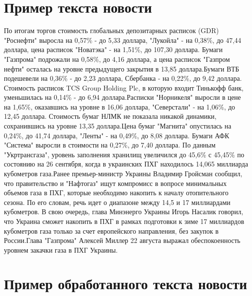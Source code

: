 \documentclass[14pt]{matmex-diploma-custom}
\begin{document}
\begin{appendices}
\section{Пример текста новости}

\label{app:text}

\noindent
По итогам торгов стоимость глобальных депозитарных расписок (GDR) "Роснефти" выросла на 0,57\% - до 5,33 доллара, "Лукойла" - на 0,38\%, до 47,44 доллара, цена расписок "Новатэка" - на 1,51\%, до 107,30 доллара. Бумаги "Газпрома" подрожали на 0,58\%, до 4,16 доллара, а цена расписок "Газпром нефти" осталась на уровне предыдущего закрытия в 13,85 доллара.Бумаги ВТБ подешевели на 0,36\% - до 2,23 доллара, Сбербанка - на 0,22\%, до 9,42 доллара. Стоимость расписок TCS Group Holding Plc, в которую входит Тинькофф банк, уменьшилась на 0,14\% - до 6,94 доллара.Расписки "Норникеля" выросли в цене на 1,65\%, оказавшись на уровне в 16,06 доллара, "Северстали" - на 1,06\%, до 12,45 доллара. Стоимость бумаг НЛМК не показала никакой динамики, сохранившись на уровне 13,35 доллара.Цена бумаг "Магнита" опустилась на 0,24\%, до 41,74 доллара, "Ленты" - на 0,49\%, до 8,08 доллара. Бумаги АФК "Система" выросли в стоимости на 0,27\%, до 7,40 доллара. По данным "Укртрансгаза", уровень заполнения хранилищ увеличился до 45,6\% с 45,45\% по состоянию на 26 сентября, когда в украинских ПХГ находилось 14,065 миллиарда кубометров газа.Ранее премьер-министр Украины Владимир Гройсман сообщил, что правительство и "Нафтогаз" ищут компромисс в вопросе минимальных объемов газа в ПХГ, которые необходимо накопить к началу отопительного сезона. По его словам, речь идет о диапазоне между 14,5 и 17 миллиардами кубометров. В свою очередь, глава Минэнерго Украины Игорь Насалик говорил, что Украина сможет накопить в ПХГ в рамках подготовки к зиме 17 миллиардов кубометров газа только за счет европейского направления, без закупок в России.Глава "Газпрома" Алексей Миллер 22 августа выражал обеспокоенность уровнем закачки газа в ПХГ Украины.

\section{Пример обработанного текста новости}

\label{app:stem}


\end{appendices}
\end{document}

